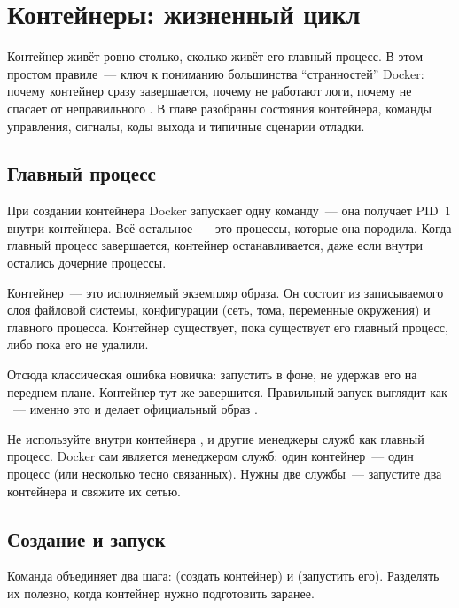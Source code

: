 \chapter{Контейнеры: жизненный цикл}

Контейнер живёт ровно столько, сколько живёт его главный процесс.
В этом простом правиле~--- ключ к пониманию большинства \enquote{странностей}
Docker: почему контейнер сразу завершается, почему не работают логи,
почему  не спасает от неправильного .
В главе разобраны состояния контейнера, команды управления, сигналы,
коды выхода и типичные сценарии отладки.

\section{Главный процесс}

При создании контейнера Docker запускает одну команду~--- она получает
PID~1 внутри контейнера. Всё остальное~--- это процессы, которые она
породила. Когда главный процесс завершается, контейнер останавливается,
даже если внутри остались дочерние процессы.

\begin{defbox}[title={Определение: контейнер (практическое)}]
Контейнер~--- это исполняемый экземпляр образа. Он состоит из
записываемого слоя файловой системы, конфигурации (сеть, тома,
переменные окружения) и главного процесса. Контейнер существует,
пока существует его главный процесс, либо пока его не удалили.
\end{defbox}

Отсюда классическая ошибка новичка: запустить  в фоне,
не удержав его на переднем плане. Контейнер тут же завершится.
Правильный запуск выглядит как ~---
именно это и делает официальный образ .

\begin{warnbox}
Не используйте внутри контейнера ,  и другие
менеджеры служб как главный процесс. Docker сам является менеджером
служб: один контейнер~--- один процесс (или несколько тесно связанных).
Нужны две службы~--- запустите два контейнера и свяжите их сетью.
\end{warnbox}

\section{Создание и запуск}

Команда  объединяет два шага: 
(создать контейнер) и  (запустить его). Разделять
их полезно, когда контейнер нужно подготовить заранее.

